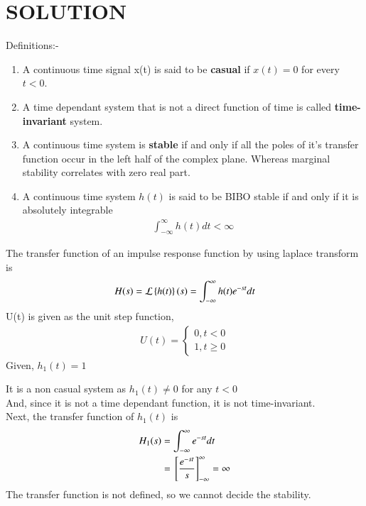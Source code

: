 \documentclass[journal,12pt,twocolumn]{IEEEtran}
\begin{document}
\section*{SOLUTION}
Definitions:-
\begin{enumerate}
    \item A continuous time signal x(t) is said to be \textbf{casual} if $x(t) = 0$ for every $t<0$.\\
    \item A time dependant system that is not a direct function of time is called \textbf{time-invariant} system.\\
    \item A continuous time system is \textbf{stable} if and only if all the poles of it's transfer function occur in the left half of the complex plane. Whereas marginal stability correlates with zero real part.\\
    \item A continuous time system $h(t)$ is said to be BIBO stable if and only if it is absolutely integrable
    \begin{align}
        \int_{-\infty}^{\infty} h(t)dt < \infty
    \end{align}
\end{enumerate}
    The transfer function of an impulse response function by using laplace transform is
    \begin{align}
    H(s) = \mathcal{L}\left\{h(t)\right\}(s) = \int_{-\infty}^{\infty} h(t)e^{-st} dt
    \end{align}
    U(t) is given as the unit step function,
\begin{align}
    U(t) = 
    \begin{cases}
    0, t<0\\
    1, t\geq 0
    \end{cases} \label{eq 0.0.6}
\end{align}
Given, {$h_1(t) = 1$}

It is a non casual system as $h_1(t) \neq 0$ for any $t<0$\\
And, since it is not a time dependant function, it is not time-invariant.\\
Next, the transfer function of $h_1(t)$ is
\begin{align}
    H_1(s) &= \int_{-\infty}^{\infty} e^{-st} dt\\
    &= {}\left[\frac{e^{-st}}{s}\right]_{-\infty}^{\infty} = \infty
\end{align}
The transfer function is not defined, so we cannot decide the stability. 
\end{document}
